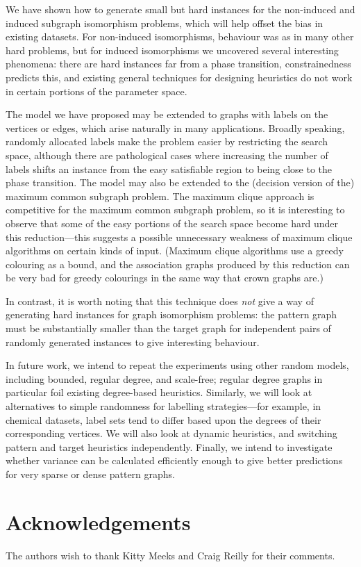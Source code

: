\documentclass[letterpaper]{article}
\begin{document}
We have shown how to generate small but hard instances for the non-induced and induced subgraph
isomorphism problems, which will help offset the bias in existing datasets. For non-induced
isomorphisms, behaviour was as in many other hard problems, but for induced isomorphisms we
uncovered several interesting phenomena: there are hard instances far from a phase transition,
constrainedness predicts this, and existing general techniques for designing heuristics do not work
in certain portions of the parameter space.

The model we have proposed may be extended to graphs with labels on the vertices or edges, which
arise naturally in many applications. Broadly speaking, randomly allocated labels make the problem
easier by restricting the search space, although there are pathological cases where increasing the
number of labels shifts an instance from the easy satisfiable region to being close to the phase
transition. The model may also be extended to the (decision version of the) maximum common subgraph
problem. The maximum clique approach is competitive for the maximum common subgraph problem, so it
is interesting to observe that some of the easy portions of the search space become hard under this
reduction---this suggests a possible unnecessary weakness of maximum clique algorithms on certain
kinds of input. (Maximum clique algorithms use a greedy colouring as a bound, and the association
graphs produced by this reduction can be very bad for greedy colourings in the same way that crown
graphs are.)

In contrast, it is worth noting that this technique does \emph{not} give a way of generating hard
instances for graph isomorphism problems: the pattern graph must be substantially smaller than the
target graph for independent pairs of randomly generated instances to give interesting behaviour.

In future work, we intend to repeat the experiments using other random models, including bounded,
regular degree, and scale-free; regular degree graphs in particular foil existing degree-based
heuristics. Similarly, we will look at alternatives to simple randomness for labelling
strategies---for example, in chemical datasets, label sets tend to differ based upon the degrees of
their corresponding vertices.  We will also look at dynamic heuristics, and switching pattern and
target heuristics independently.  Finally, we intend to investigate whether variance can be
calculated efficiently enough to give better predictions for very sparse or dense pattern graphs.

\section*{Acknowledgements}

The authors wish to thank Kitty Meeks and Craig Reilly for their comments.



\end{document}
